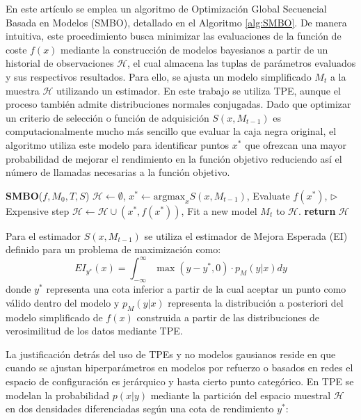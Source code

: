 \documentclass[11pt,a4paper]{article}
\begin{document}
	En este artículo se emplea un algoritmo de Optimización Global Secuencial Basada en Modelos (SMBO), detallado en el Algoritmo \ref{alg:SMBO}. De manera intuitiva, este procedimiento busca minimizar las evaluaciones de la función de coste $f(x)$ mediante la construcción de modelos bayesianos a partir de un historial de observaciones $\mathcal{H}$, el cual almacena las tuplas de parámetros evaluados y sus respectivos resultados. Para ello, se ajusta un modelo simplificado $M_t$ a la muestra $\mathcal{H}$ utilizando un estimador. En este trabajo se utiliza TPE, aunque el proceso también admite distribuciones normales conjugadas. Dado que optimizar un criterio de selección o función de adquisición $S(x, M_{t-1})$ es computacionalmente mucho más sencillo que evaluar la caja negra original, el algoritmo utiliza este modelo para identificar puntos \(x^*\) que ofrezcan una mayor probabilidad de mejorar el rendimiento en la función objetivo reduciendo así el número de llamadas necesarias a la función objetivo.
	\begin{algorithm}[H]
		\caption{Pseudo-código SMBO.}
		\label{alg:SMBO}
		\begin{algorithmic}[1]
			\State \textbf{SMBO}($f, M_0, T, S$)
			\State $\mathcal{H} \leftarrow \emptyset$,
			\State $x^* \leftarrow \text{argmax}_x S(x, M_{t-1})$,
			\State Evaluate $f(x^*)$, \hfill $\triangleright$ Expensive step
			\State $\mathcal{H} \leftarrow \mathcal{H} \cup (x^*, f(x^*))$,
			\State Fit a new model $M_t$ to $\mathcal{H}$.
			\EndFor
			\State \textbf{return} $\mathcal{H}$
		\end{algorithmic}
	\end{algorithm}
	
	
	Para el estimador \(S(x, M_{t-1})\) se utiliza el estimador de Mejora Esperada (EI) definido para un problema de maximización como:
	\begin{equation}
		EI_{y^*}(x)=\int_{-\infty}^{\infty} \max(y-y^*,0)\cdot p_{M}(y|x) dy
	\end{equation}
	donde \(y^*\) representa una cota inferior a partir de la cual aceptar un punto como válido dentro del modelo y \(p_{M}(y|x)\) representa la distribución a posteriori del modelo simplificado de \(f(x)\) construida a partir de las distribuciones de verosimilitud de los datos mediante TPE.
	\newline
	
	La justificación detrás del uso de TPEs y no modelos gausianos reside en que cuando se ajustan hiperparámetros en modelos por refuerzo o basados en redes el espacio de configuración es jerárquico y hasta cierto punto categórico. En TPE se modelan la probabilidad $p(x|y)$ mediante la partición del espacio muestral $\mathcal{H}$ en dos densidades diferenciadas según una cota de rendimiento $y^*$:
	
\end{document}
